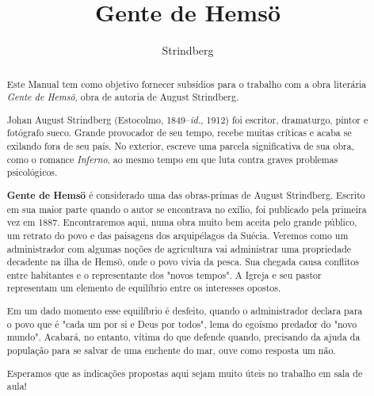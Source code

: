 \documentclass[12pt]{extarticle}
\begin{document}

\newcommand{\AutorLivro}{Strindberg}
\newcommand{\TituloLivro}{Gente de Hemsö}
\newcommand{\Tema}{Ficção, mistério e fantasia}
\newcommand{\Genero}{Romance}
\newcommand{\imagemCapa}{./images/PNLD0039-01.png}
\newcommand{\issnppub}{---}
\newcommand{\issnepub}{---}
\newcommand{\colaborador}{\textbf{Bruno Gradella e Vicente Castro} Sofia Boldrini (edição)}


\title{\TituloLivro}
\author{\AutorLivro}
\def\authornotes{\colaborador}

\date{}
\maketitle

\baselineskip\par

\begin{abstract}
Este Manual tem como objetivo fornecer subsídios para o trabalho com a
obra literária \emph{Gente de Hemsö}, obra de autoria de August
Strindberg.

Johan August Strindberg (Estocolmo, 1849--\textit{id.}, 1912) 
foi escritor, dramaturgo, pintor e fotógrafo sueco. Grande provocador
de seu tempo, recebe muitas críticas e acaba se exilando fora de 
seu país. No exterior, escreve uma parcela significativa de sua obra,
como o romance \textit{Inferno}, ao mesmo tempo em que luta contra graves 
problemas psicológicos.

\textbf{Gente de Hemsö} é considerado uma das obras-primas de August Strindberg. 
Escrito em sua maior parte quando o autor se encontrava no exílio, foi publicado 
pela primeira vez em 1887. Encontraremos aqui, numa obra muito bem aceita pelo grande 
público, um retrato do povo e das paisagens dos arquipélagos da Suécia.
Veremos como um administrador com algumas noções de agricultura vai administrar uma 
propriedade decadente na ilha de Hemsö, onde o povo vivia da pesca. Sua chegada causa 
conflitos entre habitantes e o representante dos "novos tempos". A Igreja e seu 
pastor representam um elemento de equilíbrio entre os interesses opostos.

Em um dado momento esse equilíbrio é desfeito, quando o administrador declara
para o povo que é "cada um por si e Deus por todos", lema do egoísmo predador
do "novo mundo". Acabará, no entanto, vítima do que defende quando, precisando
da ajuda da população para se salvar de uma enchente do mar, ouve como resposta
um não.

Esperamos que as indicações propostas aqui sejam muito úteis no trabalho em
sala de aula! 
\end{abstract}
\end{document}

